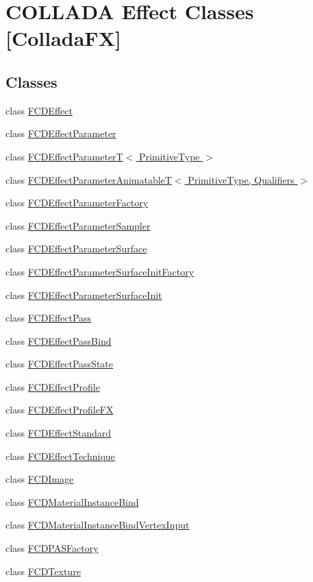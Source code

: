 \hypertarget{group__FCDEffect}{
\section{COLLADA Effect Classes \mbox{[}ColladaFX\mbox{]}}
\label{group__FCDEffect}
}
\subsection*{Classes}
\begin{DoxyCompactItemize}
\item 
class \hyperlink{classFCDEffect}{FCDEffect}
\item 
class \hyperlink{classFCDEffectParameter}{FCDEffectParameter}
\item 
class \hyperlink{classFCDEffectParameterT}{FCDEffectParameterT$<$ PrimitiveType $>$}
\item 
class \hyperlink{classFCDEffectParameterAnimatableT}{FCDEffectParameterAnimatableT$<$ PrimitiveType, Qualifiers $>$}
\item 
class \hyperlink{classFCDEffectParameterFactory}{FCDEffectParameterFactory}
\item 
class \hyperlink{classFCDEffectParameterSampler}{FCDEffectParameterSampler}
\item 
class \hyperlink{classFCDEffectParameterSurface}{FCDEffectParameterSurface}
\item 
class \hyperlink{classFCDEffectParameterSurfaceInitFactory}{FCDEffectParameterSurfaceInitFactory}
\item 
class \hyperlink{classFCDEffectParameterSurfaceInit}{FCDEffectParameterSurfaceInit}
\item 
class \hyperlink{classFCDEffectPass}{FCDEffectPass}
\item 
class \hyperlink{classFCDEffectPassBind}{FCDEffectPassBind}
\item 
class \hyperlink{classFCDEffectPassState}{FCDEffectPassState}
\item 
class \hyperlink{classFCDEffectProfile}{FCDEffectProfile}
\item 
class \hyperlink{classFCDEffectProfileFX}{FCDEffectProfileFX}
\item 
class \hyperlink{classFCDEffectStandard}{FCDEffectStandard}
\item 
class \hyperlink{classFCDEffectTechnique}{FCDEffectTechnique}
\item 
class \hyperlink{classFCDImage}{FCDImage}
\item 
class \hyperlink{classFCDMaterialInstanceBind}{FCDMaterialInstanceBind}
\item 
class \hyperlink{classFCDMaterialInstanceBindVertexInput}{FCDMaterialInstanceBindVertexInput}
\item 
class \hyperlink{classFCDPASFactory}{FCDPASFactory}
\item 
class \hyperlink{classFCDTexture}{FCDTexture}
\end{DoxyCompactItemize}
